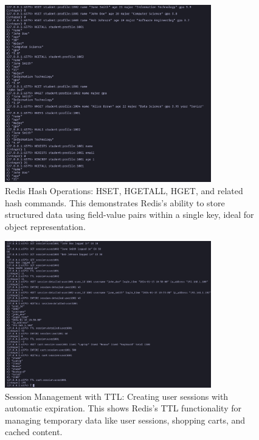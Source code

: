 \begin{figure}[H]
  \centering
  \includegraphics[width=0.8\textwidth]{task-4/screenshots/hash-operations.png}
  \caption{Redis Hash Operations: HSET, HGETALL, HGET, and related hash commands. This demonstrates Redis's ability to store structured data using field-value pairs within a single key, ideal for object representation.}
  \label{fig:hash-operations}
\end{figure}

\begin{figure}[H]
  \centering
  \includegraphics[width=0.8\textwidth]{task-4/screenshots/session-details.png}
  \caption{Session Management with TTL: Creating user sessions with automatic expiration. This shows Redis's TTL functionality for managing temporary data like user sessions, shopping carts, and cached content.}
  \label{fig:session-details}
\end{figure}

